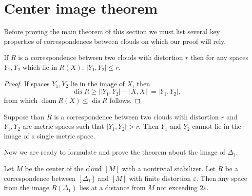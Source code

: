 \section{Center image theorem}

Before proving the main theorem of this section we must list several
key properties of correspondences between clouds on which our proof will rely.
\begin{lemma}\label{lemDiamImage}
  If $R$ is a correspondence between two clouds with distortion $r$
  then for any spaces $Y_1,Y_2$ which lie in $R(X)$, $|Y_1,Y_2| \le r$.
\end{lemma}

\begin{proof}
  If spaces $Y_{1}, Y_{2}$ lie in the image of $X$, then
  $$
  \operatorname{dis} R \geq \big|\left|Y_{1},Y_{2}\right| -
  \left|X,X\right|\big| = |Y_{1}, Y_{2}|,
  $$
  from which $\operatorname{diam} R(X) \leq \operatorname{dis} R$ follows.
\end{proof}

\begin{corollary}
  Suppose than $R$ is a correspondence between two clouds with
  distortion $r$ and $Y_1,Y_2$ are metric spaces such that $|Y_1,Y_2|
  > r$. Then $Y_1$ and $Y_2$ cannot lie in the image of a single metric space.
\end{corollary}
Now we are ready to formulate and prove the theorem about the image
of $\Delta_1$.
\begin{theorem}\label{thrmCenterImage}
  Let $M$ be the center of the cloud $[M]$ with a nontrivial
  stabilizer. Let $R$ be a correspondence between $[\Delta_{1}]$ and
  $[M]$ with finite distortion $\varepsilon$. Then any space from the
  image $R(\Delta_{1})$ lies at a distance from $M$ not exceeding
  $2\varepsilon$.
\end{theorem}

